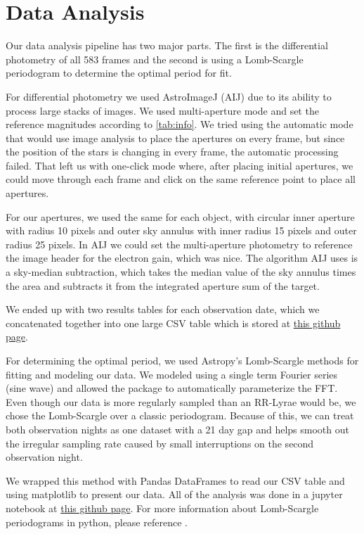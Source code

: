 \documentclass[%
aip,
jmp,
reprint,
floatfix,
nofootinbib
]{revtex4-1}
\begin{document}
	\section{Data Analysis}
	
	Our data analysis pipeline has two major parts. The first is the differential photometry of all 583 frames and the second is using a Lomb-Scargle periodogram to determine the optimal period for fit. 
	
	For differential photometry we used AstroImageJ (AIJ) due to its ability to process large stacks of images. We used multi-aperture mode and set the reference magnitudes according to \autoref{tab:info}. We tried using the automatic mode that would use image analysis to place the apertures on every frame, but since the position of the stars is changing in every frame, the automatic processing failed. That left us with one-click mode where, after placing initial apertures, we could move through each frame and click on the same reference point to place all apertures. 
	
	For our apertures, we used the same for each object, with circular inner aperture with radius 10 pixels and outer sky annulus with inner radius 15 pixels and outer radius 25 pixels. In AIJ we could set the multi-aperture photometry to reference the image header for the electron gain, which was nice. The algorithm AIJ uses is a sky-median subtraction, which takes the median value of the sky annulus times the area and subtracts it from the integrated aperture sum of the target.
	
	We ended up with two results tables for each observation date, which we concatenated together into one large CSV table which is stored at \href{https://github.com/mileslucas/astro344l/blob/master/project/data/full_data.csv}{this github page}.
	
	For determining the optimal period, we used Astropy's Lomb-Scargle methods for fitting and modeling our data. We modeled using a single term Fourier series (sine wave) and allowed the package to automatically parameterize the FFT. Even though our data is more regularly sampled than an RR-Lyrae would be, we chose the Lomb-Scargle over a classic periodogram. Because of this, we can treat both observation nights as one dataset with a 21 day gap and helps smooth out the irregular sampling rate caused by small interruptions on the second observation night.
	
	 We wrapped this method with Pandas DataFrames to read our CSV table and using matplotlib to present our data. All of the analysis was done in a jupyter notebook at \href{https://github.com/mileslucas/astro344l/blob/master/project/src/project.ipynb}{this github page}. For more information about Lomb-Scargle periodograms in python, please reference \cite{2017arXiv170309824V}.
\end{document}
